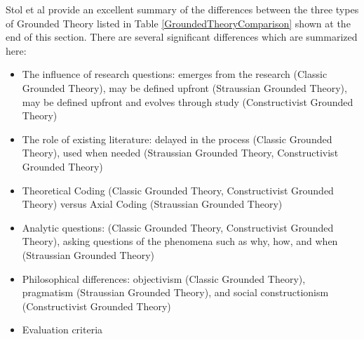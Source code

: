 Stol et al \cite{StolGroundedTheory} provide an excellent summary of the differences between the three types of Grounded Theory listed in Table \ref{GroundedTheoryComparison} shown at the end of this section. There are several significant differences which are summarized here:
\begin{itemize}
\item The influence of research questions: emerges from the research (Classic Grounded Theory), may be defined upfront (Straussian Grounded Theory), may be defined upfront and evolves through study (Constructivist Grounded Theory)
\item The role of existing literature: delayed in the process (Classic Grounded Theory), used when needed (Straussian Grounded Theory, Constructivist Grounded Theory)
\item Theoretical Coding (Classic Grounded Theory, Constructivist Grounded Theory) versus Axial Coding (Straussian Grounded Theory)
\item Analytic questions:  (Classic Grounded Theory, Constructivist Grounded Theory), asking questions of the phenomena such as why, how, and when (Straussian Grounded Theory)
\item Philosophical differences: objectivism (Classic Grounded Theory), pragmatism (Straussian Grounded Theory), and social constructionism (Constructivist Grounded Theory)
\item Evaluation criteria
\end{itemize}


